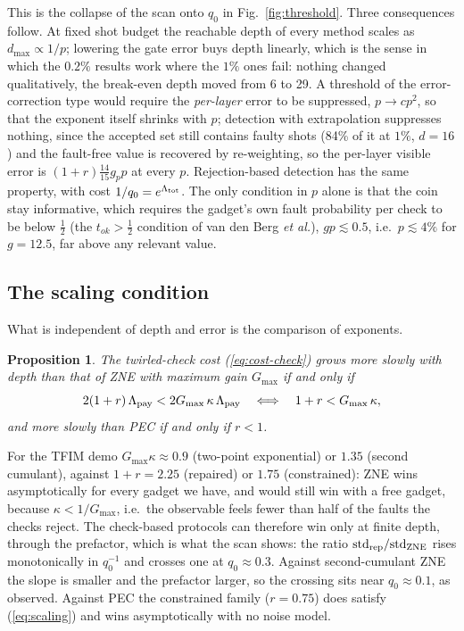 \documentclass[11pt,a4paper]{article}
\newtheorem{proposition}{Proposition}
\theoremstyle{remark}
\begin{document}
This is the collapse of the scan onto $q_0$ in Fig.~\ref{fig:threshold}. Three consequences follow. At fixed shot budget the reachable depth of every method scales as $d_{\max}\propto1/p$; lowering the gate error buys depth linearly, which is the sense in which the $0.2\%$ results work where the $1\%$ ones fail: nothing changed qualitatively, the break-even depth moved from 6 to 29. A threshold of the error-correction type would require the \emph{per-layer} error to be suppressed, $p\to cp^2$, so that the exponent itself shrinks with $p$; detection with extrapolation suppresses nothing, since the accepted set still contains faulty shots (84\% of it at $1\%$, $d=16$) and the fault-free value is recovered by re-weighting, so the per-layer visible error is $(1+r)\tfrac{14}{15}g_pp$ at every $p$. Rejection-based detection has the same property, with cost $1/q_0=e^{\Lambda_{\rm tot}}$. The only condition in $p$ alone is that the coin stay informative, which requires the gadget's own fault probability per check to be below $\tfrac12$ (the $t_{ok}>\tfrac12$ condition of van den Berg \emph{et al.}), $gp\lesssim0.5$, i.e.\ $p\lesssim4\%$ for $g=12.5$, far above any relevant value.

\subsection{The scaling condition}

What is independent of depth and error is the comparison of exponents.

\begin{proposition}
\label{prop:scaling}
The twirled-check cost (\ref{eq:cost-check}) grows more slowly with depth than that of ZNE with maximum gain $G_{\max}$ if and only if
\begin{equation}
2(1+r)\,\Lambda_{\rm pay}<2G_{\max}\,\kappa\,\Lambda_{\rm pay}\quad\Longleftrightarrow\quad 1+r<G_{\max}\,\kappa ,
\label{eq:scaling}
\end{equation}
and more slowly than PEC if and only if $r<1$.
\end{proposition}

For the TFIM demo $G_{\max}\kappa\approx0.9$ (two-point exponential) or $1.35$ (second cumulant), against $1+r=2.25$ (repaired) or $1.75$ (constrained): ZNE wins asymptotically for every gadget we have, and would still win with a free gadget, because $\kappa<1/G_{\max}$, i.e.\ the observable feels fewer than half of the faults the checks reject. The check-based protocols can therefore win only at finite depth, through the prefactor, which is what the scan shows: the ratio $\mathrm{std}_{\rm rep}/\mathrm{std}_{\rm ZNE}$ rises monotonically in $q_0^{-1}$ and crosses one at $q_0\approx0.3$. Against second-cumulant ZNE the slope is smaller and the prefactor larger, so the crossing sits near $q_0\approx0.1$, as observed. Against PEC the constrained family ($r=0.75$) does satisfy (\ref{eq:scaling}) and wins asymptotically with no noise model.
\end{document}
